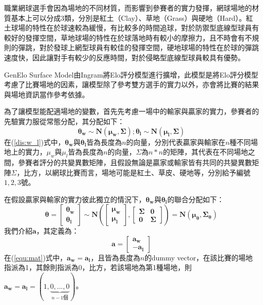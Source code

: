 \documentclass[12pt]{article}
\begin{document}
職業網球選手會因為場地的不同材質，而影響到參賽者的實力發揮，網球場地的材質基本上可以分成3類，分別是紅土（Clay）、草地（Grass）與硬地（Hard）。紅土球場的特性在於球速較為緩慢，有比較多的時間追球，對於防禦型底線型球員有較好的發揮空間，草地球場的特性在於球落地時有較小的摩擦力，且不時會有不規則的彈跳，對於發球上網型球員有較佳的發揮空間，硬地球場的特性在於球的彈跳速度快，因此讓對手有較少的反應時間，對於侵略型底線型球員較具有優勢。

GenElo Surface Model由Ingram\cite{Ingram+2021}將Elo評分模型進行擴增，此模型是將Elo評分模型考慮了比賽場地的因素，讓模型除了參考雙方選手的實力以外，亦會將比賽的結果與場地資訊當作參考依據。

為了讓模型能配適場地的變數，首先先考慮一場中的輸家與贏家的實力，參賽者的先驗實力服從常態分配，其分配如下：
\begin{equation}
\boldsymbol{\theta_w \sim N(\mu_w,\Sigma); \theta_l \sim N(\mu_l, \Sigma)}
\label{dis:w_l}
\end{equation}
在(\ref{dis:w_l})式中，$\boldsymbol{\theta_w}$與$\boldsymbol{\theta_l}$皆為長度為$n$的向量，分別代表贏家與輸家在$n$種不同場地上的實力，$\mu_w$與$\mu_l$皆為長度為$n$的向量，$\Sigma$為$n * n$的矩陣，其代表在不同場地之間，參賽者評分的共變異數矩陣，且假設無論是贏家或輸家皆有共同的共變異數矩陣$\Sigma$，比方，以網球比賽而言，場地可能是紅土、草皮、硬地等，分別給予編號$1,2,3$號。

在假設贏家與輸家的實力彼此獨立的情況下，$\boldsymbol{\theta_w}$與$\boldsymbol{\theta_l}$的聯合分配如下：
\begin{equation}
\boldsymbol{\theta = \begin{bmatrix}
\theta_w \\ \theta_l \end{bmatrix} \sim N\left(\begin{bmatrix}
\mu_w \\ \mu_l
\end{bmatrix},\begin{bmatrix}
\Sigma & 0 \\ 0 & \Sigma
\end{bmatrix}
\right) = N(\mu_{\theta},\Sigma_{\theta})}
\end{equation}
我們介紹$\boldsymbol{a}$，其定義為：
\begin{equation}
\boldsymbol{a} = \begin{bmatrix}
\boldsymbol{a_w} \\ -\boldsymbol{a_l}
\end{bmatrix}
\label{equ:mat}
\end{equation}
在(\ref{equ:mat})式中，$\boldsymbol{a_w} = \boldsymbol{a_l}$，且皆為長度為$n$的dummy vector，在該比賽的場地指派為1，其餘則指派為0，比方，若該場地為第1種場地，則$\boldsymbol{a_w} = \boldsymbol{a_l} = (1,\underbrace{0,...,0}_{n-1 個})$。
\end{document}
